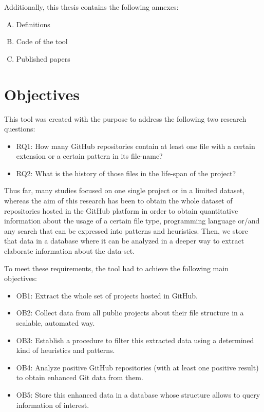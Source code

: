 \documentclass[a4paper, 12pt]{book}
\begin{document}
Additionally, this thesis contains the following annexes:
\begin{enumerate}[A.]
  \item Definitions
  \item Code of the tool
  \item Published papers
\end{enumerate}

\cleardoublepage
\chapter{Objectives}
\label{sec:objectives}

This tool was created with the purpose to address the following two research questions:
\begin{itemize}
  \item RQ1: How many GitHub repositories contain at least one file with a certain extension or a certain
        pattern in its file-name?
  \item RQ2: What is the history of those files in the life-span of the project?
\end{itemize}

Thus far, many studies focused on one single project or in a limited dataset,
whereas the aim of this research has been to obtain the whole dataset of repositories hosted in the GitHub platform
in order to obtain quantitative information about the usage of a certain file type, programming language
or/and any search that can be expressed into patterns and heuristics. Then, we store that data in a database
where it can be analyzed in a deeper way to extract elaborate information about the data-set.

To meet these requirements, the tool had to achieve the following main objectives:
\begin{itemize}
  \item OB1: Extract the whole set of projects hosted in GitHub.
  \item OB2: Collect data from all public projects about their file structure in a scalable, automated way.
  \item OB3: Establish a procedure to filter this extracted data using a determined kind of heuristics and patterns.
  \item OB4: Analyze positive GitHub repositories (with at least one positive result) to obtain enhanced Git data from them.
  \item OB5: Store this enhanced data in a database whose structure allows to query information of interest.
\end{itemize}
\end{document}
